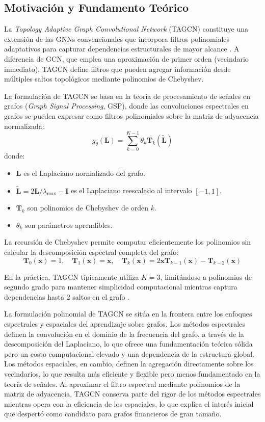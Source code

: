 \subsection{Motivación y Fundamento Teórico}

La \textit{Topology Adaptive Graph Convolutional Network} (TAGCN) constituye una extensión de las GNNs convencionales que incorpora filtros polinomiales adaptativos para capturar dependencias estructurales de mayor alcance \cite{Du2017TopologyNetworks}. A diferencia de GCN, que emplea una aproximación de primer orden (vecindario inmediato), TAGCN define filtros que pueden agregar información desde múltiples saltos topológicos mediante polinomios de Chebyshev.

La formulación de TAGCN se basa en la teoría de procesamiento de señales en grafos (\textit{Graph Signal Processing}, GSP), donde las convoluciones espectrales en grafos se pueden expresar como filtros polinomiales sobre la matriz de adyacencia normalizada:
\[ g_\theta(\mathbf{L}) = \sum_{k=0}^{K-1} \theta_k \mathbf{T}_k(\tilde{\mathbf{L}}) \]
donde:
\begin{itemize}
    \item $\mathbf{L}$ es el Laplaciano normalizado del grafo.
    \item $\tilde{\mathbf{L}} = 2\mathbf{L}/\lambda_{\max} - \mathbf{I}$ es el Laplaciano reescalado al intervalo $[-1, 1]$.
    \item $\mathbf{T}_k$ son polinomios de Chebyshev de orden $k$.
    \item $\theta_k$ son parámetros aprendibles.
\end{itemize}

La recursión de Chebyshev permite computar eficientemente los polinomios sin calcular la descomposición espectral completa del grafo:
\[ \mathbf{T}_0(\mathbf{x}) = 1, \quad \mathbf{T}_1(\mathbf{x}) = \mathbf{x}, \quad \mathbf{T}_k(\mathbf{x}) = 2\mathbf{x}\mathbf{T}_{k-1}(\mathbf{x}) - \mathbf{T}_{k-2}(\mathbf{x}) \]

En la práctica, TAGCN típicamente utiliza $K=3$, limitándose a polinomios de segundo grado para mantener simplicidad computacional mientras captura dependencias hasta 2 saltos en el grafo \cite{Du2017TopologyNetworks}.

La formulación polinomial de TAGCN se sitúa en la frontera entre los enfoques espectrales y espaciales del aprendizaje sobre grafos. Los métodos espectrales definen la convolución en el dominio de la frecuencia del grafo, a través de la descomposición del Laplaciano, lo que ofrece una fundamentación teórica sólida pero un costo computacional elevado y una dependencia de la estructura global. Los métodos espaciales, en cambio, definen la agregación directamente sobre los vecindarios, lo que resulta más eficiente y flexible pero menos fundamentado en la teoría de señales. Al aproximar el filtro espectral mediante polinomios de la matriz de adyacencia, TAGCN conserva parte del rigor de los métodos espectrales mientras opera con la eficiencia de los espaciales, lo que explica el interés inicial que despertó como candidato para grafos financieros de gran tamaño.

